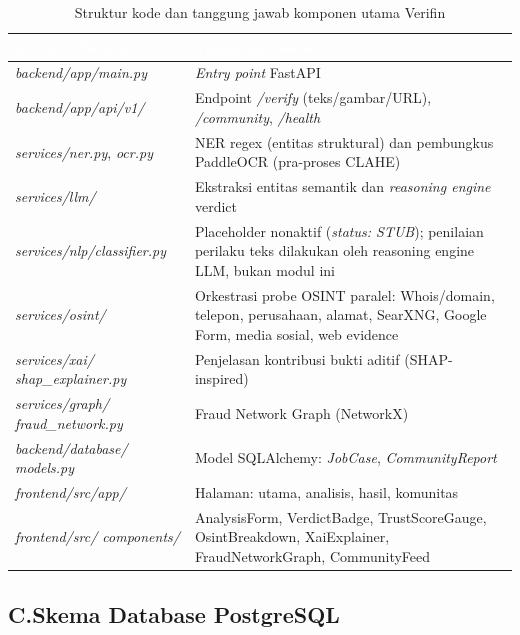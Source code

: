 \documentclass[12pt,a4paper]{article}
\newcommand{\thead}[1]{\textcolor{white}{\textbf{#1}}}
\renewcommand{\arraystretch}{1.16}
\begin{document}
\begin{adjustwidth}{0.50cm}{0pt}
\begin{table}[H]
\centering
\caption{Struktur kode dan tanggung jawab komponen utama Verifin}
\label{tab:struktur-kode}
\small
\renewcommand{\arraystretch}{1.15}
\begin{tabularx}{\linewidth}{@{}p{4.5cm}Y@{}}
\toprule
{}\thead{Modul / Berkas} & \thead{Tanggung Jawab} \\
\midrule
{}
\textit{backend/app/main.py} & \textit{Entry point} FastAPI \\
\textit{backend/app/api/v1/} & Endpoint \textit{/verify} (teks/gambar/URL), \textit{/community}, \textit{/health} \\
\textit{services/ner.py}, \textit{ocr.py} & NER regex (entitas struktural) dan pembungkus PaddleOCR (pra-proses CLAHE) \\
\textit{services/llm/} & Ekstraksi entitas semantik dan \textit{reasoning engine} verdict \\
\textit{services/nlp/classifier.py} & Placeholder nonaktif (\textit{status: STUB}); penilaian perilaku teks dilakukan oleh reasoning engine LLM, bukan modul ini \\
\textit{services/osint/} & Orkestrasi probe OSINT paralel: Whois/domain, telepon, perusahaan, alamat, SearXNG, Google Form, media sosial, web evidence \\
\textit{services/xai/ shap\_explainer.py} & Penjelasan kontribusi bukti aditif (SHAP-inspired) \\
\textit{services/graph/ fraud\_network.py} & Fraud Network Graph (NetworkX) \\
\textit{backend/database/ models.py} & Model SQLAlchemy: \textit{JobCase}, \textit{CommunityReport} \\
\textit{frontend/src/app/} & Halaman: utama, analisis, hasil, komunitas \\
\textit{frontend/src/ components/} & AnalysisForm, VerdictBadge, TrustScoreGauge, OsintBreakdown, XaiExplainer, FraudNetworkGraph, CommunityFeed \\
\bottomrule
\end{tabularx}
\end{table}
\end{adjustwidth}

\subsection*{C.\quad Skema Database PostgreSQL}
\end{document}
